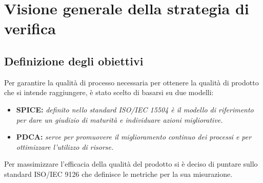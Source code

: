 %


\section{Visione generale della strategia di verifica}

	\subsection{Definizione degli obiettivi}
	Per garantire la qualità di processo necessaria per ottenere la qualità di prodotto che si intende raggiungere, è stato scelto di basarsi su due modelli:
	\begin{itemize}
  		\item \textbf{SPICE:} \textit{definito nello standard ISO/IEC 15504 è il modello di riferimento per dare un giudizio di maturità e individuare azioni migliorative.}
 		 \item \textbf{PDCA:} \textit{serve per promuovere il miglioramento continuo dei processi e per ottimizzare l'utilizzo di risorse.}
	\end{itemize}
	Per massimizzare l'efficacia della qualità del prodotto si è deciso di puntare sullo standard ISO/IEC 9126 che definisce le metriche per la sua misurazione.
	
